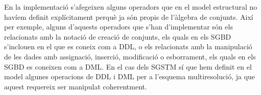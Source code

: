 En la implementació s'afegeixen alguns operadors que en el model
estructural no havíem definit explícitament perquè ja són propis de
l'àlgebra de conjunts. Així per exemple, alguns d'aquests operadors
que s'han d'implementar són els relacionats amb la notació de creació
de conjunts, %
els quals en els \gls{SGBD} s'inclouen en el que es coneix com a
\gls{DDL}, o els relacionats amb la manipulació de les dades amb
assignació, inserció, modificació o esborrament, els quals en els
\gls{SGBD} es coneixen com a \gls{DML}.  En el cas dels \gls{SGSTM} sí
que hem definit en el model algunes operacions de \gls{DDL} i \gls{DML} per a
l'esquema multiresolució, ja que aquest requereix ser manipulat
coherentment.













